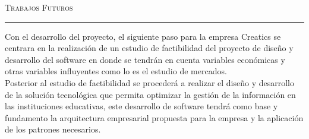 \vspace*{3cm}
\noindent\Huge\textsc{Trabajos Futuros}\\
\normalsize
\noindent\rule[2pt]{\textwidth}{0.8pt}
\hspace*{3cm}

Con el desarrollo del proyecto, el siguiente paso para la empresa Creatics se centrara en la realización de un estudio de factibilidad del proyecto de diseño y desarrollo del software en donde se tendrán en cuenta variables económicas y otras variables influyentes como lo es el estudio de mercados. \\

Posterior al estudio de factibilidad se procederá a realizar el diseño y desarrollo de la solución tecnológica que permita optimizar la gestión de la información en las instituciones educativas, este desarrollo de software tendrá como base y fundamento la arquitectura empresarial propuesta para la empresa y la aplicación de los patrones necesarios. \\